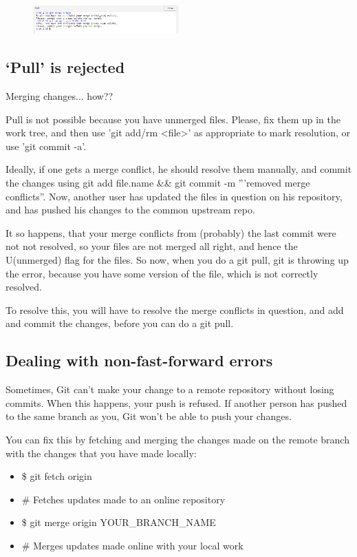 \documentclass[12pt]{../SOP4_alpha}\usepackage[]{graphicx}\usepackage[]{color}
\begin{document}
\begin{figure}
\centering
\includegraphics[width=0.5\textwidth]{graphics/MergeError.jpg}
\end{figure}

\subsection{`Pull' is rejected}

\NP Merging changes... how??

Pull is not possible because you have unmerged files.
Please, fix them up in the work tree, and then use 'git add/rm <file>'
as appropriate to mark resolution, or use 'git commit -a'.

Ideally, if one gets a merge conflict, he should resolve them manually, and commit the changes using git add file.name \&\& git commit -m '''removed merge conflicts''. Now, another user has updated the files in question on his repository, and has pushed his changes to the common upstream repo.

It so happens, that your merge conflicts from (probably) the last commit were not not resolved, so your files are not merged all right, and hence the U(unmerged) flag for the files. So now, when you do a git pull, git is throwing up the error, because you have some version of the file, which is not correctly resolved.

To resolve this, you will have to resolve the merge conflicts in question, and add and commit the changes, before you can do a git pull.

\subsection{Dealing with non-fast-forward errors}

\NP Sometimes, Git can't make your change to a remote repository without losing commits. When this happens, your push is refused. If another person has pushed to the same branch as you, Git won't be able to push your changes.

\NP You can fix this by fetching and merging the changes made on the remote branch with the changes that you have made locally:
\begin{itemize}
  \item \$ git fetch origin
  \item \# Fetches updates made to an online repository
  \item \$ git merge origin YOUR\_BRANCH\_NAME
  \item \# Merges updates made online with your local work
\end{itemize}
\end{document}
